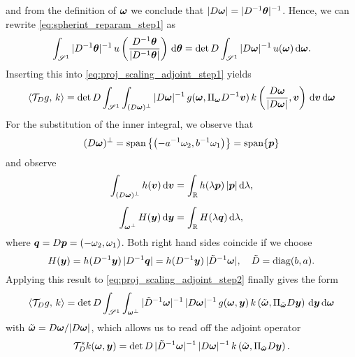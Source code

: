 \documentclass{amsart}
\newcommand*{\Dinv}{{\ensuremath{D^{-1}}}}
\begin{document}
%
and from the definition of ${\boldsymbol{\omega}}$ we conclude that $\abs{D \Bomega} = \abs{\Dinv \Btheta}^{-1}$. Hence, we can rewrite 
\eqref{eq:spherint_reparam_step1} as
%
\begin{equation}
 \label{eq:spherint_reparam}
 \int_{\Sphere^1} \abs{\Dinv \Btheta}^{-1}\, u\left(\frac{\Dinv\Btheta}{\abs{\Dinv\Btheta}}\right)\, \diff \Btheta = 
 \det D \int_{\Sphere^1} \abs{D \Bomega}^{-1}\, u(\Bomega)\, \diff\Bomega.
\end{equation} 
%
Inserting this into \eqref{eq:proj_scaling_adjoint_step1} yields
%
\begin{equation}
 \label{eq:proj_scaling_adjoint_step2}
 \spr{\Top_D g}{k} = \det D \int_{\Sphere^1} \int_{(D\Bomega)^\perp} \abs{D \Bomega}^{-1}\, g(\Bomega, \Pi_\Bomega \Dinv\Bv)\, 
 k\left(\frac{D \Bomega}{\abs{D \Bomega}}, \Bv\right)\, \diff\Bv\, \diff\Bomega
\end{equation} 
%
For the substitution of the inner integral, we observe that
%
\begin{equation*}
 (D{\boldsymbol{\omega}})^\perp = \operatorname*{span}\left\lbrace \left(-a^{-1}\omega_2, b^{-1}\omega_1\right) \right\rbrace = \operatorname*{span}\lbrace {\boldsymbol{p}} \rbrace
\end{equation*}
%
and observe
%
\begin{align*}
 \int_{(D{\boldsymbol{\omega}})^\perp} h({\boldsymbol{v}})\, \mathrm{d} {\boldsymbol{v}} 
 &= \int_{\mathbb{R}} h(\lambda {\boldsymbol{p}})\, |{\boldsymbol{p}}|\, \mathrm{d}\lambda,\\[1ex]
 \int_{{\boldsymbol{\omega}}^\perp} H({\boldsymbol{y}})\, \mathrm{d} {\boldsymbol{y}}
 &= \int_{\mathbb{R}} H(\lambda {\boldsymbol{q}})\, \mathrm{d}\lambda,
\end{align*}
%
where ${\boldsymbol{q}} = D{\boldsymbol{p}} = (-\omega_2, \omega_1)$. Both right hand sides coincide if we choose 
%
\begin{equation*}
 H(\By) = h(\Dinv \By)\, \abs{\Dinv \Bq} = h(\Dinv \By)\, \abs{\tilde D^{-1} \Bomega},\quad \tilde D = \DIAG(b,a).
\end{equation*}
%
Applying this result to \eqref{eq:proj_scaling_adjoint_step2} finally gives the form
%
\begin{equation}
 \label{eq:proj_scaling_adjoint_final}
 \langle {\ensuremath{\mathcal{T}}}_D g,\,k\rangle = \det D \int_{\mathscr{S}^1} \int_{{\boldsymbol{\omega}}^\perp} |\tilde D^{-1} {\boldsymbol{\omega}}|^{-1}\, |D {\boldsymbol{\omega}}|^{-1}\, 
 g({\boldsymbol{\omega}}, {\boldsymbol{y}})\, k\left(\tilde{{\boldsymbol{\omega}}}, \Pi_{\tilde{{\boldsymbol{\omega}}}} D {\boldsymbol{y}}\right)\, \mathrm{d}{\boldsymbol{y}}\, \mathrm{d}{\boldsymbol{\omega}}
\end{equation} 
%
with $\tilde{{\boldsymbol{\omega}}} = {D {\boldsymbol{\omega}}}/{|D {\boldsymbol{\omega}}|}$, which allows us to read off the adjoint operator
%
\begin{equation}
 \label{eq:proj_scaling_adjoint}
 {\ensuremath{\mathcal{T}}}_D^* k({\boldsymbol{\omega}}, {\boldsymbol{y}}) = \det D\, |\tilde D^{-1} {\boldsymbol{\omega}}|^{-1}\, |D {\boldsymbol{\omega}}|^{-1}\, 
 k\left(\tilde{{\boldsymbol{\omega}}}, \Pi_{\tilde{{\boldsymbol{\omega}}}} D {\boldsymbol{y}}\right).
\end{equation}
\end{document}
